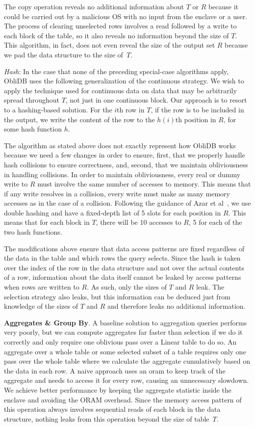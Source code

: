 \documentclass[letterpaper,twocolumn,10pt]{article}
\def\name/{ObliDB}
\begin{document}
The copy operation reveals no additional information about $T$ or $R$ because it could be carried out by a malicious OS with no input from the enclave or a user. The process of clearing unselected rows involves a read followed by a write to each block of the table, so it also reveals no information beyond the size of $T$. This algorithm, in fact, does not even reveal the size of the output set $R$ because we pad the data structure to the size of~$T$.

\textit{Hash}: In the case that none of the preceding special-case algorithms apply, \name/ uses the following generalization of the continuous strategy. We wish to apply the technique used for continuous data on data that may be arbitrarily spread throughout $T$, not just in one continuous block. Our approach is to resort to a hashing-based solution. For the $i$th row in $T$, if the row is to be included in the output, we write the content of the row to the $h(i)$th position in $R$, for some hash function $h$.

The algorithm as stated above does not exactly represent how \name/ works because we need a few changes in order to ensure, first, that we properly handle hash collisions to ensure correctness, and, second, that we maintain obliviousness in handling collisions. In order to maintain obliviousness, every real or dummy write to $R$ must involve the same number of accesses to memory. This means that if any write resolves in a collision, every write must make as many memory accesses as in the case of a collision. Following the guidance of Azar et al~\cite{ABKU99}, we use double hashing and have a fixed-depth list of 5 slots for each position in $R$. This means that for each block in $T$, there will be 10 accesses to $R$, 5 for each of the two hash functions.

The modifications above ensure that data access patterns are fixed regardless of the data in the table and which rows the query selects. Since the hash is taken over the index of the row in the data structure and not over the actual contents of a row, information about the data itself cannot be leaked by access patterns when rows are written to $R$. As such, only the sizes of $T$ and $R$ leak. The selection strategy also leaks, but this information can be deduced just from knowledge of the sizes of $T$ and $R$ and therefore leaks no additional information.

  \noindent \textbf{Aggregates \& Group By}.
A baseline solution to aggregation queries performs very poorly, but we can compute aggregates far faster than selection if we do it correctly and only require one oblivious pass over a Linear table to do so.  An aggregate over a whole table or some selected subset of a table requires only one pass over the whole table where we calculate the aggregate cumulatively based on the data in each row. A naive approach uses an oram to keep track of the aggregate and needs to access it for every row, causing an unnecessary slowdown. We achieve better performance by keeping the aggregate statistic inside the enclave and avoiding the ORAM overhead. Since the memory access pattern of this operation always involves sequential reads of each block in the data structure, nothing leaks from this operation beyond the size of table~$T$.
\end{document}
